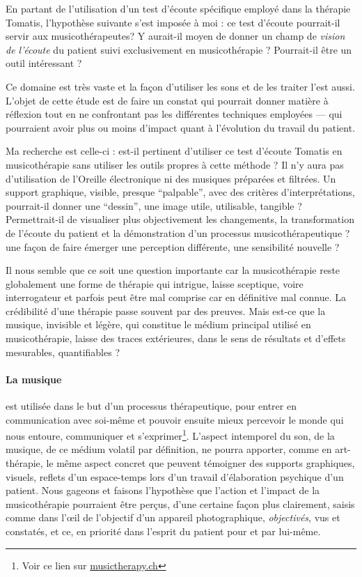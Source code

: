 En partant de l'utilisation d'un test d'écoute spécifique employé dans
la thérapie Tomatis, l'hypothèse suivante s'est imposée à moi : ce
test d'écoute pourrait-il servir aux musicothérapeutes? Y aurait-il
moyen de donner un champ de \emph{vision de l'écoute} du patient suivi
exclusivement en musicothérapie ? Pourrait-il être un outil
intéressant ?


Ce domaine est très vaste et la façon d'utiliser les sons et de les
traiter l'est aussi. L'objet de cette étude est de faire un constat
qui pourrait donner matière à réflexion tout en ne confrontant pas les
différentes techniques employées --- qui pourraient avoir plus ou %
moins d'impact quant à l'évolution du travail du patient.

Ma recherche est celle-ci : est-il pertinent d'utiliser ce test
d'écoute Tomatis en musicothérapie sans utiliser les outils propres à
cette méthode ? Il n'y aura pas d'utilisation de l'Oreille
électronique ni des musiques préparées et filtrées.  Un support
graphique, visible, presque ``palpable'', avec des critères
d'interprétations, pourrait-il donner une ``dessin'', une image utile,
utilisable, tangible ? Permettrait-il de visualiser plus objectivement
les changements, la transformation de l'écoute du patient et la
démonstration d'un processus musicothérapeutique ? %
une façon de faire émerger  %
une perception différente, une sensibilité
nouvelle ?

  Il nous semble que ce soit une
question importante car la musicothérapie reste globalement une forme de thérapie qui intrigue, laisse sceptique, voire  interrogateur et parfois peut être mal comprise car
en définitive mal connue. %
La crédibilité d'une thérapie
passe souvent par des preuves. Mais est-ce que la musique, invisible
et légère, qui constitue le médium principal utilisé en musicothérapie, laisse
des traces extérieures, dans le sens de résultats et d'effets mesurables, quantifiables ?
\paragraph{La musique} est utilisée dans le but d'un processus
thérapeutique, pour entrer en communication avec soi-même et pouvoir ensuite mieux percevoir le monde qui nous
entoure, communiquer et s'exprimer\footnote{%
Voir ce lien sur \href{http://www.musictherapy.ch/fr/musicotherapie/quest-ce-que-la-musicotherapie/}{musictherapy.ch}}.
L'aspect intemporel du son, de la musique, de ce médium volatil par
définition, ne pourra apporter, comme en art-thérapie, le
même aspect concret que peuvent témoigner des supports graphiques,
visuels, reflets d'un espace-temps lors d'un travail d'élaboration
psychique d'un patient. Nous gageons et faisons l'hypothèse que l'action et l'impact de la
musicothérapie pourraient être perçus, d'une certaine façon plus
clairement, saisis comme dans l'\oe il de l'objectif d'un appareil
photographique,\textsl{ objectivés}, vus et constatés, et ce, en priorité dans l'esprit du
patient pour et par lui-même.

